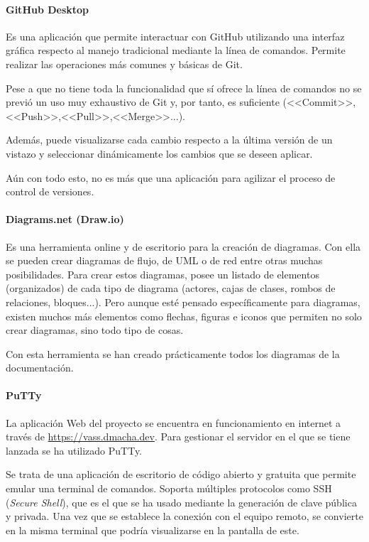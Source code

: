 \paragraph{GitHub Desktop}
Es una aplicación que permite interactuar con GitHub utilizando una interfaz
gráfica respecto al manejo tradicional mediante la línea de comandos. Permite
realizar las operaciones más comunes y básicas de Git.

Pese a que no tiene toda la funcionalidad que sí ofrece la línea de comandos no
se previó un uso muy exhaustivo de Git y, por tanto, es suficiente
(<<Commit>>,<<Push>>,<<Pull>>,<<Merge>>...).

Además, puede visualizarse cada cambio respecto a la última versión de un
vistazo y seleccionar dinámicamente los cambios que se deseen aplicar.

Aún con todo esto, no es más que una aplicación para agilizar el proceso de
control de versiones.

\paragraph{Diagrams.net (Draw.io)}
Es una herramienta online y de escritorio para la creación de diagramas. Con
ella se pueden crear diagramas de flujo, de UML o de red entre otras muchas
posibilidades. Para crear estos diagramas, posee un listado de elementos
(organizados) de cada tipo de diagrama (actores, cajas de clases, rombos de
relaciones, bloques...). Pero aunque esté pensado específicamente para
diagramas, existen muchos más elementos como flechas, figuras e iconos que
permiten no solo crear diagramas, sino todo tipo de cosas.

Con esta herramienta se han creado prácticamente todos los diagramas de la
documentación.

\paragraph{PuTTy}
La aplicación Web del proyecto se encuentra en funcionamiento en internet a
través de \url{https://vass.dmacha.dev}. Para gestionar el servidor en el que se
tiene lanzada se ha utilizado PuTTy.

Se trata de una aplicación de escritorio de código abierto y gratuita que
permite emular una terminal de comandos. Soporta múltiples protocolos como SSH
(\textit{Secure Shell}), que es el que se ha usado mediante la generación de
clave pública y privada. Una vez que se establece la conexión con el equipo
remoto, se convierte en la misma terminal que podría visualizarse en la pantalla
de este.

